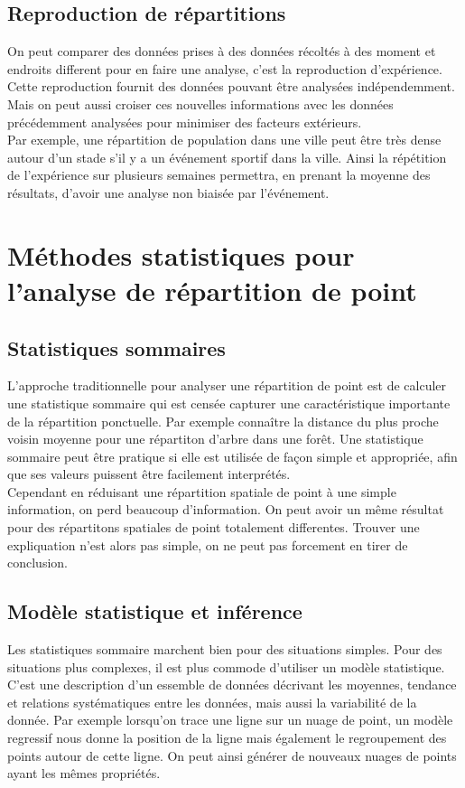 \documentclass[french,12pt,a4paper]{report}
\begin{document}
\subsection{Reproduction de répartitions}
On peut comparer des données prises à des données récoltés à des moment et endroits different pour en faire une analyse, c'est la reproduction d'expérience.\\
Cette reproduction fournit des données pouvant être analysées indépendemment. Mais on peut aussi croiser ces nouvelles informations avec les données précédemment analysées pour minimiser des facteurs extérieurs.\\
Par exemple, une répartition de population dans une ville peut être très dense autour d'un stade s'il y a un événement sportif dans la ville. Ainsi la répétition de l'expérience sur plusieurs semaines permettra, en prenant la moyenne des résultats, d'avoir une analyse non biaisée par l'événement.\\


\section{Méthodes statistiques pour l'analyse de répartition de point}

\subsection{Statistiques sommaires}
L'approche traditionnelle pour analyser une répartition de point est de calculer une statistique sommaire qui est censée capturer une caractéristique importante de la répartition ponctuelle. Par exemple connaître la distance du plus proche voisin moyenne pour une répartiton d'arbre dans une forêt. Une statistique sommaire peut être pratique si elle est utilisée de façon simple et appropriée, afin que ses valeurs puissent être facilement interprétés.\\
Cependant en réduisant une répartition spatiale de point à une simple information, on perd beaucoup d'information. On peut avoir un même résultat pour des répartitons spatiales de point totalement differentes. Trouver une expliquation n'est alors pas simple, on ne peut pas forcement en tirer de conclusion.

\subsection{Modèle statistique et inférence}
Les statistiques sommaire marchent bien pour des situations simples. Pour des situations plus complexes, il est plus commode d'utiliser un modèle statistique. C'est une description d'un essemble de données décrivant les moyennes, tendance et relations systématiques entre les données, mais aussi la variabilité de la donnée. Par exemple lorsqu'on trace une ligne sur un nuage de point, un modèle regressif nous donne la position de la ligne mais également le regroupement des points autour de cette ligne. On peut ainsi générer de nouveaux nuages de points ayant les mêmes propriétés.
\end{document}

